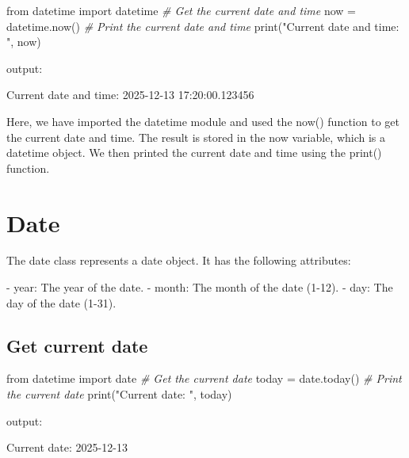\documentclass[11pt]{article}
\newenvironment{Shaded}{}{}
\newcommand{\StringTok}[1]{\textcolor[rgb]{0.25,0.44,0.63}{{#1}}}
\newcommand{\CommentTok}[1]{\textcolor[rgb]{0.38,0.63,0.69}{\textit{{#1}}}}
\newcommand{\NormalTok}[1]{{#1}}
\newcommand{\ImportTok}[1]{{#1}}
\newcommand{\OperatorTok}[1]{\textcolor[rgb]{0.40,0.40,0.40}{{#1}}}
\newcommand{\BuiltInTok}[1]{{#1}}
\begin{document}
\begin{Shaded}
\begin{Highlighting}[]
\ImportTok{from}\NormalTok{ datetime }\ImportTok{import}\NormalTok{ datetime}
\CommentTok{\# Get the current date and time}
\NormalTok{now }\OperatorTok{=}\NormalTok{ datetime.now()}
\CommentTok{\# Print the current date and time}
\BuiltInTok{print}\NormalTok{(}\StringTok{"Current date and time: "}\NormalTok{, now)}
\end{Highlighting}
\end{Shaded}

output:

\begin{Shaded}
\begin{Highlighting}[]
\NormalTok{Current date and time:  2025{-}12{-}13 17:20:00.123456}
\end{Highlighting}
\end{Shaded}

Here, we have imported the datetime module and used the now() function
to get the current date and time. The result is stored in the now
variable, which is a datetime object. We then printed the current date
and time using the print() function.

\section{Date}

The date class represents a date object. It has the following
attributes: 

- year: The year of the date. 
- month: The month of the date (1-12). 
- day: The day of the date (1-31).

\subsection{Get current date}

\begin{Shaded}
\begin{Highlighting}[]
\ImportTok{from}\NormalTok{ datetime }\ImportTok{import}\NormalTok{ date}
\CommentTok{\# Get the current date}
\NormalTok{today }\OperatorTok{=}\NormalTok{ date.today()}
\CommentTok{\# Print the current date}
\BuiltInTok{print}\NormalTok{(}\StringTok{"Current date: "}\NormalTok{, today)}
\end{Highlighting}
\end{Shaded}

output:

\begin{Shaded}
\begin{Highlighting}[]
\NormalTok{Current date:  2025{-}12{-}13}
\end{Highlighting}
\end{Shaded}
\end{document}

